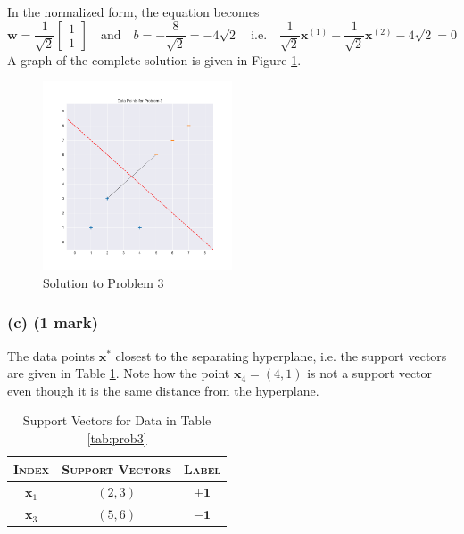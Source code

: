 \documentclass[12pt]{article}
\begin{document}
    In the normalized form, the equation becomes
    \begin{equation}
        \label{eq:optimal-norm}
        \mathbf{w} = \frac{1}{\sqrt{2}} \begin{bmatrix} 1 \\ 1 \end{bmatrix} \quad \text{and} \quad b = -\frac{8}{\sqrt{2}} = -4 \sqrt{2} \quad
        \text{i.e.} \quad \frac{1}{\sqrt{2}}\mathbf{x}^{(1)} + \frac{1}{\sqrt{2}}\mathbf{x}^{(2)} - 4\sqrt{2} = 0
    \end{equation}
    A graph of the complete solution is given in Figure \ref{fig:prob3-sol}.
    \begin{figure}[htbp]
        \centering
        \includegraphics[width=0.5\textwidth]{../Assets/svs.png}
        \caption{Solution to Problem 3}
        \label{fig:prob3-sol}
    \end{figure}

    \subsubsection*{(c) (1 mark)}
    The data points $\mathbf{x}^{*}$ closest to the separating hyperplane, i.e.
    the support vectors are given in Table \ref{tab:support-vectors}. Note how the
    point $\mathbf{x}_{4} = (4, 1)$ is not a support vector even though it
    is the same distance from the hyperplane.
    \begin{table}[htbp]
        \centering
        \begin{tabular}{cc|c}
            \textsc{Index} & \textsc{Support Vectors} & \textsc{Label} \\
            \hline
            $\mathbf{x}_{1}$ & $(2, 3)$ & $\mathbf{+1}$ \\
            $\mathbf{x}_{3}$ & $(5, 6)$ & $\mathbf{-1}$ \\
        \end{tabular}
        \caption{Support Vectors for Data in Table \ref{tab:prob3}}
        \label{tab:support-vectors}
    \end{table}
\end{document}
